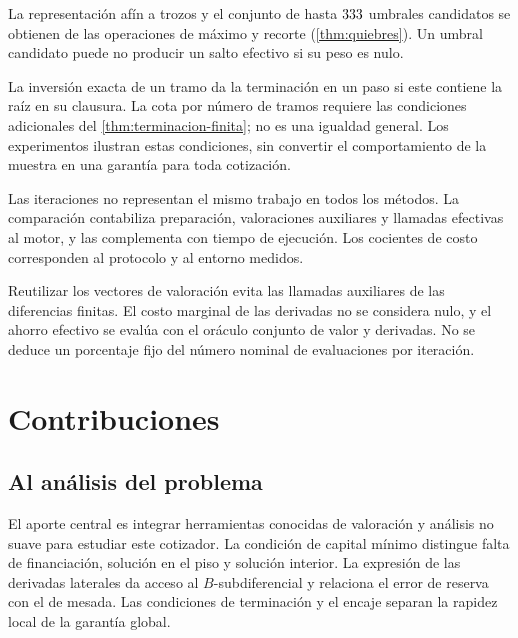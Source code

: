 \begin{description}[leftmargin=1.1cm,style=nextline]
\item[H1 --- caracterización analítica.] La representación afín a trozos y el
  conjunto de hasta $333$ umbrales candidatos se obtienen de las
  operaciones de máximo y recorte (\cref{thm:quiebres}). Un umbral candidato
  puede no producir un salto efectivo si su peso es nulo.

\item[H2 --- terminación bajo condiciones precisas.] La inversión exacta de un
  tramo da la terminación en un paso si este contiene la raíz en su clausura.
  La cota por número de tramos requiere las condiciones adicionales del
  \cref{thm:terminacion-finita}; no es una igualdad general. Los experimentos
  ilustran estas condiciones, sin convertir el comportamiento de la muestra en
  una garantía para toda cotización.

\item[H3 --- contabilidad de costo.] Las iteraciones no representan el mismo
  trabajo en todos los métodos. La comparación contabiliza preparación,
  valoraciones auxiliares y llamadas efectivas al motor, y las complementa con
  tiempo de ejecución. Los cocientes de costo corresponden al protocolo y al
  entorno medidos.

\item[H4 --- derivada analítica conjunta.] Reutilizar los vectores de valoración
  evita las llamadas auxiliares de las diferencias finitas. El costo marginal de
  las derivadas no se considera nulo, y el ahorro efectivo se evalúa con el oráculo
  conjunto de valor y derivadas. No se deduce un porcentaje fijo del número
  nominal de evaluaciones por iteración.
\end{description}

\section{Contribuciones}

\subsection{Al análisis del problema}

El aporte central es integrar herramientas conocidas de valoración y análisis no
suave para estudiar este cotizador. La condición de capital mínimo distingue
falta de financiación, solución en el piso y solución interior. La expresión de
las derivadas laterales da acceso al $B$-subdiferencial y relaciona el error de
reserva con el de mesada. Las condiciones de terminación y el encaje separan la
rapidez local de la garantía global.

